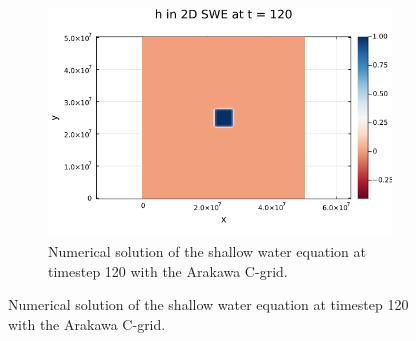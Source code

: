 \begin{figure}[h]
\begin{subfigure}[b]{0.3\textwidth}
        \includegraphics[width=\textwidth]{./images/swe2d-coriolis-120.png}
        \caption{Numerical solution of the shallow water equation at timestep 120 with the Arakawa C-grid.}
        \label{fig:coriolis120}
    \end{subfigure}
    \vspace{0.5cm} %


\end{figure}
